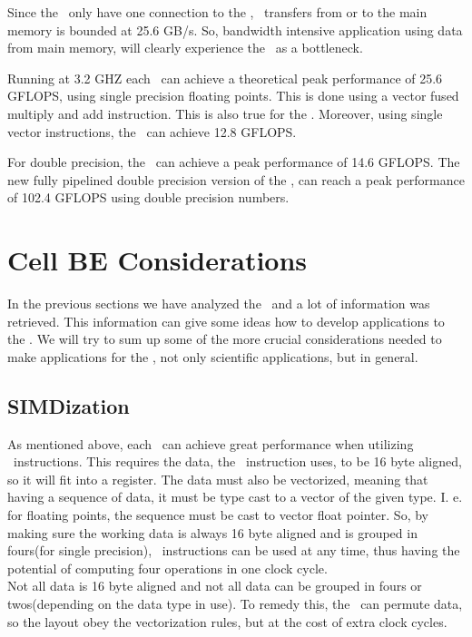 Since the \MIC\ only have one connection to the \EIB{}, \DMA\
transfers from or to the main memory is bounded at 25.6 GB/s. So,
bandwidth intensive application using data from main memory, will
clearly experience the \MIC\ as a bottleneck.



Running at 3.2 GHZ each \SPE\ can achieve a theoretical peak
performance of 25.6 GFLOPS, using single precision floating
points. This is done using a vector fused multiply and add
instruction. This is also true for the \PPE{}. Moreover, using single
vector instructions, the \SPE\ can achieve 12.8 GFLOPS.

For double precision, the \CBE\ can achieve a peak performance of 14.6
GFLOPS. The new fully pipelined double precision version of
the \CBE{}, can reach a peak performance of 102.4 GFLOPS using double
precision numbers\cite{ibm_powerxcell8i}.


\section{Cell BE Considerations}
\label{sec:considerations}

In the previous sections we have analyzed the \CBE\ and a lot of
information was retrieved. This information can give some ideas how to
develop applications to the
\CBE{}. We will try to sum up some of the more crucial considerations
needed to make applications for the \CBE{}, not only scientific
applications, but in general.

\subsection{SIMDization}
\label{sec:simdization}

As mentioned above, each \SPE\ can achieve great performance when
utilizing \SIMD\ instructions. This requires the data, the
\SIMD\ instruction uses, to be 16 byte aligned, so it will fit into a
register. The data must also be vectorized, meaning that having a
sequence of data, it must be type cast to a vector of the given
type. I. e. for floating points, the sequence must be cast to vector
float pointer. So, by making sure the working data is always 16 byte aligned
and is grouped in fours(for single precision), \SIMD\ instructions can
be used at any time, thus having the potential of computing four
operations in one clock cycle.\\

Not all data is 16 byte aligned and not all data can be grouped in
fours or twos(depending on the data type in use). To remedy this, the
\SPU\ can permute data, so the layout obey the vectorization rules, but at the cost of extra clock cycles.

